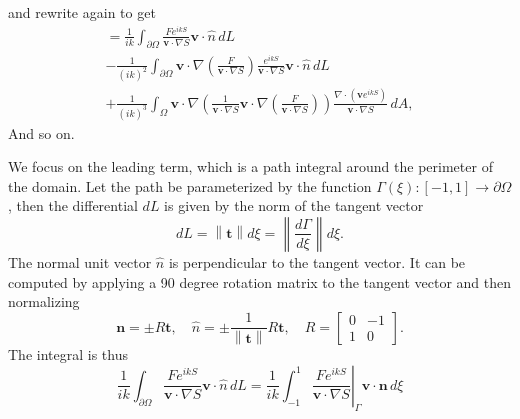 \documentclass{article}
\newcommand{\norm}[1]{\left\lVert #1 \right\rVert}
\theoremstyle{plain}
\begin{document}
and rewrite again to get
\begin{multline}
	= \frac{1}{ik} \int_{\partial\Omega} \frac{Fe^{ikS}}{\mathbf{v}\cdot\nabla S} \mathbf{v}\cdot\hat{n} \,dL \\
	- \frac{1}{(ik)^2} \int_{\partial\Omega} \mathbf{v}\cdot\nabla\left( \frac{F}{\mathbf{v}\cdot\nabla S} \right)
	\frac{e^{ikS}}{\mathbf{v}\cdot\nabla S} \mathbf{v}\cdot\hat{n} \,dL \\
	+ \frac{1}{(ik)^3} \int_{\Omega} \mathbf{v}\cdot\nabla\left( \frac{1}{\mathbf{v}\cdot\nabla S} 
	\mathbf{v}\cdot\nabla\left( \frac{F}{\mathbf{v}\cdot\nabla S} \right) \right) \frac{\nabla\cdot\left( \mathbf{v}e^{ikS} \right)}{\mathbf{v}\cdot\nabla S} \,dA,
\end{multline}
And so on.

We focus on the leading term, which is a path integral around the perimeter of the domain.
Let the path be parameterized by the function $\Gamma(\xi):[-1,1]\rightarrow\partial\Omega$,
then the differential $dL$ is given by the norm of the tangent vector
\begin{equation}
	dL = \norm{\mathbf{t}} d\xi = \norm{\frac{d\Gamma}{d\xi}} d\xi.
\end{equation}
The normal unit vector $\hat{n}$ is perpendicular to the tangent vector.
It can be computed by applying a 90 degree rotation matrix to the tangent vector and then normalizing
\begin{equation}
	\mathbf{n} = \pm R\mathbf{t},
	\quad
	\hat{n} = \pm \frac{1}{\norm{\mathbf{t}}}R\mathbf{t},
	\quad
	R=\begin{bmatrix}
		0 & -1 \\
		1 & 0
	\end{bmatrix}.
\end{equation}
The integral is thus
\begin{equation}
	\frac{1}{ik} \int_{\partial\Omega} \frac{Fe^{ikS}}{\mathbf{v}\cdot\nabla S} \mathbf{v}\cdot\hat{n} \,dL
	= \frac{1}{ik} \int_{-1}^1 \left. \frac{Fe^{ikS}}{\mathbf{v}\cdot\nabla S} \right\rvert_{\Gamma} \mathbf{v}\cdot\mathbf{n} \,d\xi
\end{equation}
\end{document}
